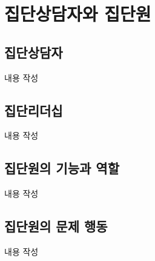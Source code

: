 \section{집단상담자와 집단원}

\subsection{집단상담자}
내용 작성

\subsection{집단리더십}
내용 작성

\subsection{집단원의 기능과 역할}
내용 작성

\subsection{집단원의 문제 행동}
내용 작성
